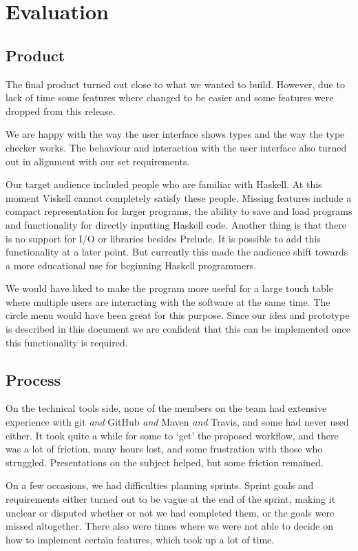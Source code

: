 \chapter{Evaluation}
\label{chap:Evaluation}

\section{Product}

The final product turned out close to what we wanted to build. However, due to lack of time some features where changed to be easier and some features were dropped from this release.

We are happy with the way the user interface shows types and the way the type checker works. The behaviour and interaction with the user interface also turned out in alignment with our set requirements.

Our target audience included people who are familiar with Haskell. At this moment Viskell cannot completely satisfy these people. Missing features include a compact representation for larger programs, the ability to save and load programs and functionality for directly inputting Haskell code. Another thing is that there is no support for I/O or libraries besides Prelude. It is possible to add this functionality at a later point. But currently this made the audience shift towards a more educational use for beginning Haskell programmers.

We would have liked to make the program more useful for a large touch table where multiple users are interacting with the software at the same time. The circle menu would have been great for this purpose. Since our idea and prototype is described in this document we are confident that this can be implemented once this functionality is required.

\section{Process}

On the technical tools side, none of the members on the team had extensive experience with git \emph{and} GitHub \emph{and} Maven \emph{and} Travis, and some had never used either. It took quite a while for some to `get' the proposed workflow, and there was a lot of friction, many hours lost, and some frustration with those who struggled. Presentations on the subject helped, but some friction remained.

On a few occasions, we had difficulties planning sprints. Sprint goals and requirements either turned out to be vague at the end of the sprint, making it unclear or disputed whether or not we had completed them, or the goals were missed altogether. There also were times where we were not able to decide on how to implement certain features, which took up a lot of time.

